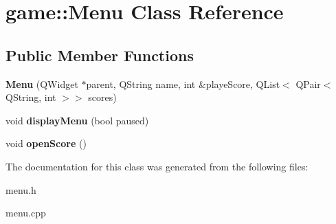 \hypertarget{classgame_1_1Menu}{}\section{game\+:\+:Menu Class Reference}
\label{classgame_1_1Menu}
\subsection*{Public Member Functions}
\begin{DoxyCompactItemize}
\item 
\mbox{\label{classgame_1_1Menu_aeac4e21eb63e4279fb241607043a58da}} 
{\bfseries Menu} (Q\+Widget $\ast$parent, Q\+String name, int \&playe\+Score, Q\+List$<$ Q\+Pair$<$ Q\+String, int $>$$>$ scores)
\item 
\mbox{\label{classgame_1_1Menu_a5e5d9b52ef1f418f8c8e220838eaf66f}} 
void {\bfseries display\+Menu} (bool paused)
\item 
\mbox{\label{classgame_1_1Menu_ab9f47142cc51b01defbba89881016415}} 
void {\bfseries open\+Score} ()
\end{DoxyCompactItemize}


The documentation for this class was generated from the following files\+:\begin{DoxyCompactItemize}
\item 
menu.\+h\item 
menu.\+cpp\end{DoxyCompactItemize}
